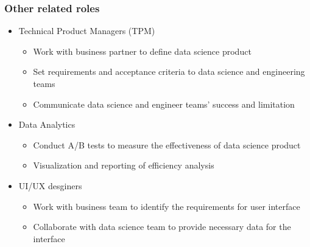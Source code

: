 \documentclass[aspectratio=169,xcolor=x11names,table]{beamer}
\begin{document}
\begin{frame}
	\frametitle{Other related roles}
	\begin{itemize}
		\item<1> Technical Product Managers (TPM)
			\begin{itemize}
				\item Work with business partner to define data science product
				\item Set requirements and acceptance criteria to data science and engineering teams
				\item Communicate data science and engineer teams' success and limitation
			\end{itemize}
			\vspace{5mm}
		\item<2> Data Analytics
			\begin{itemize}
				\item Conduct A/B tests to measure the effectiveness of data science product
				\item Visualization and reporting of efficiency analysis
			\end{itemize}
			\vspace{5mm}
		\item<3> UI/UX desginers
			\begin{itemize}
				\item Work with business team to identify the requirements for user interface
				\item Collaborate with data science team to provide necessary data for the interface
			\end{itemize}
	\end{itemize}
\end{frame}
\end{document}
